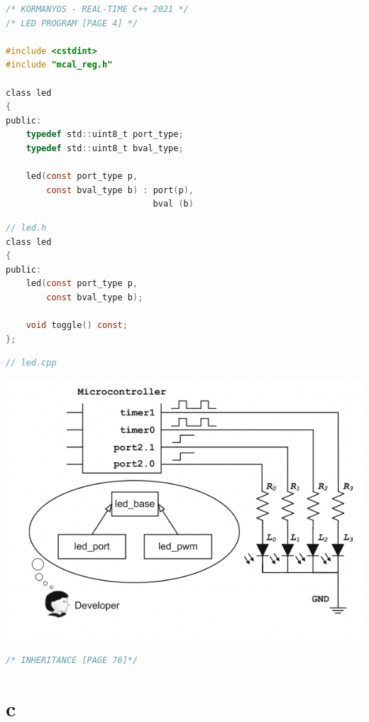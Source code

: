 \documentclass[8pt]{extarticle}
\begin{document}
\begin{small}
\begin{multicols}{2}
\begin{lstlisting}[language=C]
/* KORMANYOS - REAL-TIME C++ 2021 */
/* LED PROGRAM [PAGE 4] */

#include <cstdint>
#include "mcal_reg.h"

class led
{
public:
	typedef std::uint8_t port_type;
	typedef std::uint8_t bval_type;
	
	led(const port_type p,
		const bval_type b) : port(p),
							 bval (b)

\end{lstlisting}

\begin{lstlisting}[language=C]
// led.h
class led
{
public:
	led(const port_type p,
		const bval_type b);
	
	void toggle() const;
};	
\end{lstlisting}
\begin{lstlisting}[language=C]
// led.cpp
\end{lstlisting}

\includegraphics[scale=0.5]{oo_mcontroller}

\begin{lstlisting}[language=C]
/* INHERITANCE [PAGE 76]*/
\end{lstlisting}





\section{c}





\end{multicols}
\end{small}
\end{document}
